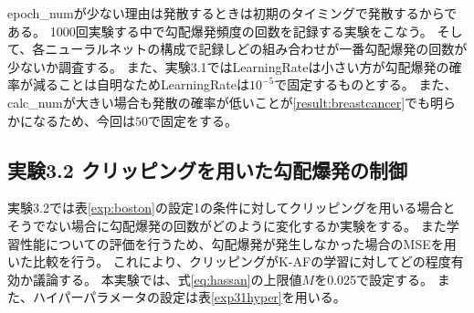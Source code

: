 epoch\_numが少ない理由は発散するときは初期のタイミングで発散するからである。
1000回実験する中で勾配爆発頻度の回数を記録する実験をこなう。
そして、各ニューラルネットの構成で記録しどの組み合わせが一番勾配爆発の回数が少ないか調査する。
また、実験3.1ではLearningRateは小さい方が勾配爆発の確率が減ることは自明なためLearningRateは$ 10^{-5} $で固定するものとする。
また、calc\_numが大きい場合も発散の確率が低いことが\ref{result:breastcancer}でも明らかになるため、今回は$ 50 $で固定をする。



\subsection{実験3.2 クリッピングを用いた勾配爆発の制御}
\label{exp3.2}
実験3.2では表\ref{exp:boston}の設定1の条件に対してクリッピングを用いる場合とそうでない場合に勾配爆発の回数がどのように変化するか実験をする。
また学習性能についての評価を行うため、勾配爆発が発生しなかった場合のMSEを用いた比較を行う。
これにより、クリッピングがK-AFの学習に対してどの程度有効か議論する。
本実験では、式\ref{eq:hassan}の上限値$ M $を0.025で設定する。
また、ハイパーパラメータの設定は表\ref{exp31hyper}を用いる。


